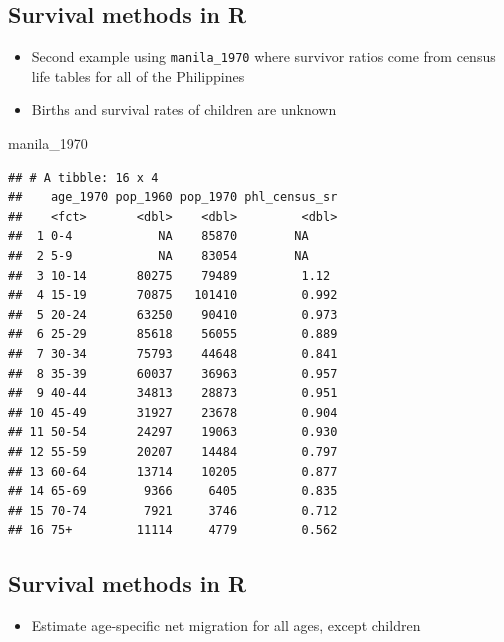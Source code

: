 \documentclass[
]{book}
\newenvironment{Shaded}{\begin{snugshade}}{\end{snugshade}}
\newcommand{\NormalTok}[1]{#1}
\providecommand{\tightlist}{%
  \setlength{\itemsep}{0pt}\setlength{\parskip}{0pt}}
\begin{document}
\hypertarget{survival-methods-in-r-2}{%
\subsection{Survival methods in R}\label{survival-methods-in-r-2}}

\begin{itemize}
\tightlist
\item
  Second example using \texttt{manila\_1970} where survivor ratios come from census life tables for all of the Philippines
\item
  Births and survival rates of children are unknown
\end{itemize}

\begin{Shaded}
\begin{Highlighting}[]
\NormalTok{manila\_1970}
\end{Highlighting}
\end{Shaded}

\begin{verbatim}
## # A tibble: 16 x 4
##    age_1970 pop_1960 pop_1970 phl_census_sr
##    <fct>       <dbl>    <dbl>         <dbl>
##  1 0-4            NA    85870        NA    
##  2 5-9            NA    83054        NA    
##  3 10-14       80275    79489         1.12 
##  4 15-19       70875   101410         0.992
##  5 20-24       63250    90410         0.973
##  6 25-29       85618    56055         0.889
##  7 30-34       75793    44648         0.841
##  8 35-39       60037    36963         0.957
##  9 40-44       34813    28873         0.951
## 10 45-49       31927    23678         0.904
## 11 50-54       24297    19063         0.930
## 12 55-59       20207    14484         0.797
## 13 60-64       13714    10205         0.877
## 14 65-69        9366     6405         0.835
## 15 70-74        7921     3746         0.712
## 16 75+         11114     4779         0.562
\end{verbatim}

\hypertarget{survival-methods-in-r-3}{%
\subsection{Survival methods in R}\label{survival-methods-in-r-3}}

\begin{itemize}
\tightlist
\item
  Estimate age-specific net migration for all ages, except children
\end{itemize}
\end{document}
